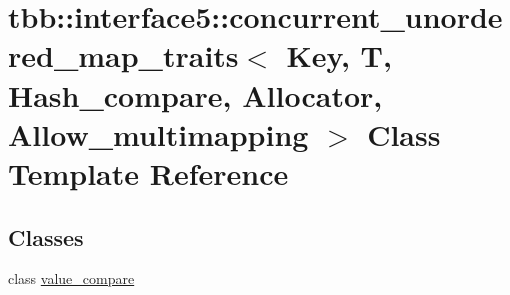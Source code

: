 \hypertarget{classtbb_1_1interface5_1_1concurrent__unordered__map__traits}{}\section{tbb\+:\+:interface5\+:\+:concurrent\+\_\+unordered\+\_\+map\+\_\+traits$<$ Key, T, Hash\+\_\+compare, Allocator, Allow\+\_\+multimapping $>$ Class Template Reference}
\label{classtbb_1_1interface5_1_1concurrent__unordered__map__traits}
\subsection*{Classes}
\begin{DoxyCompactItemize}
\item 
class \hyperlink{classtbb_1_1interface5_1_1concurrent__unordered__map__traits_1_1value__compare}{value\+\_\+compare}
\end{DoxyCompactItemize}
